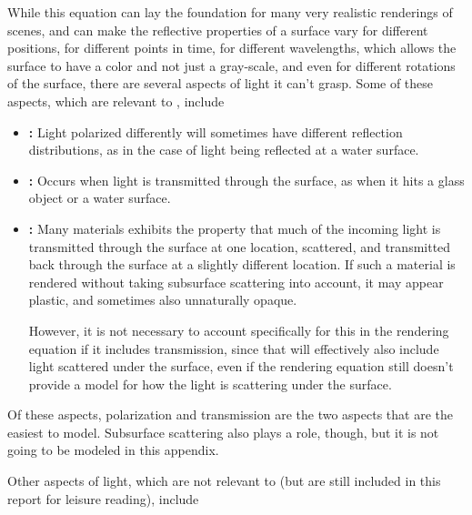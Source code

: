 While this equation can lay the foundation for many very realistic renderings of \threedimensional scenes, and can make the reflective properties of a surface vary for different positions, for different points in time, for different wavelengths, which allows the surface to have a color and not just a gray-scale, and even for different rotations of the surface, there are several aspects of light it can't grasp. Some of these aspects, which are relevant to \surfacewaterrendering, include

\begin{itemize}
\item \textbf{:} Light polarized differently will sometimes have different reflection distributions, as in the case of light being reflected at a water surface.

\item \textbf{:} Occurs when light is transmitted through the surface, as when it hits a glass object or a water surface.

\item \textbf{:} Many materials exhibits the property that much of the incoming light is transmitted through the surface at one location, scattered, and transmitted back through the surface at a slightly different location. If such a material is rendered without taking subsurface scattering into account, it may appear plastic, and sometimes also unnaturally opaque.

However, it is not necessary to account specifically for this in the rendering equation if it includes transmission, since that will effectively also include light scattered under the surface, even if the rendering equation still doesn't provide a model for how the light is scattering under the surface.
\end{itemize}

Of these aspects, polarization and transmission are the two aspects that are the easiest to model. Subsurface scattering also plays a role, though, but it is not going to be modeled in this appendix.

Other aspects of light, which are not relevant to \surfacewaterrendering (but are still included in this report for leisure reading), include


